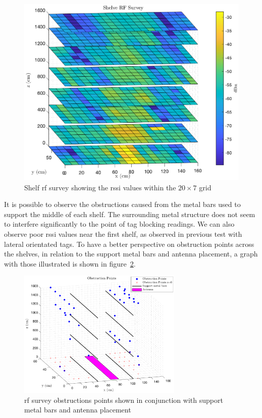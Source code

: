 \begin{figure}
    \centering
    \includegraphics[width=0.7\linewidth]{./figs/tests/rfsurvey-old.eps}
    \caption{Shelf \acs{rf} survey showing the \ac{rssi} values within the $20\times7$ grid}
    \label{fig:rfsurvey}
\end{figure}

It is possible to observe the obstructions caused from the metal bars used to support the middle of each shelf. The surrounding metal structure does not seem to interfere significantly to the point of tag blocking readings. We can also observe poor \ac{rssi} values near the first shelf, as observed in previous test with lateral orientated tags.
To have a better perspective on obstruction points across the shelves, in relation to the support metal bars and antenna placement, a graph with those illustrated is shown in figure~\ref{fig:shelveobstructions}. 

\begin{figure}
    \centering
    \includegraphics[width=0.7\textwidth]{figs/tests/obstructions.eps}
    \caption{\acs{rf} survey obstructions points shown in conjunction with support metal bars and antenna placement}
    \label{fig:shelveobstructions}
\end{figure}

